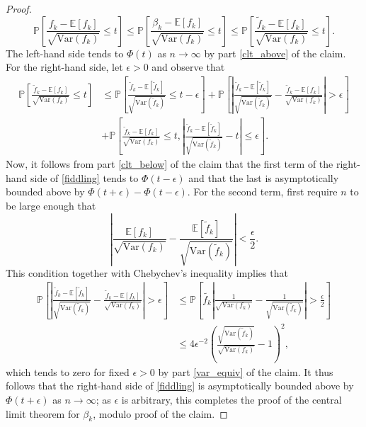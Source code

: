 \documentclass{amsart}
\theoremstyle{definition}
\newcommand{\E}{\mathbb{E}}
\renewcommand{\P}{\mathbb{P}}
\newcommand{\var}{\mathrm{Var}}
\renewcommand{\1}{\mathbb{1}}
\begin{document}
\begin{proof}
$$\P\left[\frac{f_k-\E[f_k]}{\sqrt{\var(f_k)}}\le
  t\right]\le\P\left[\frac{\beta_k-\E[f_k]}{\sqrt{\var(f_k)}}\le
  t\right]\le\P\left[\frac{\tilde{f}_k-\E[f_k]}{\sqrt{\var(f_k)}}\le
  t\right].$$ 
The left-hand side tends to $\Phi(t)$ as $n\to\infty$ by part \ref{clt_above}
of the claim.  For the right-hand side, let $\epsilon>0$ and observe that
\begin{equation}\begin{split}\label{fiddling}
\P\left[\frac{\tilde{f}_k-\E[f_k]}{\sqrt{\var(f_k)}}\le
  t\right]&\le\P\left[\frac{\tilde{f}_k-\E[\tilde{f}_k]}{\sqrt{\var(\tilde{f}_k)
}}\le  t-\epsilon\right]+\P\left[\left|\frac{\tilde{f}_k-\E[\tilde{f}_k]}{
\sqrt{\var(\tilde{f}_k)}}-\frac{\tilde{f}_k-\E[f_k]}{\sqrt{\var(f_k)
}}\right|>\epsilon\right]\\&
+\P\left[\frac{\tilde{f}_k-\E[f_k]}{\sqrt{\var(f_k)}}\le
  t, \left|\frac{\tilde{f}_k-\E[\tilde{f}_k]}{\sqrt{\var(\tilde{f}_k)
}}-t\right|\le \epsilon\right].
\end{split}\end{equation}
Now, it follows from part \ref{clt_below} of the claim that the first 
term of the right-hand side of \eqref{fiddling} tends to 
$\Phi(t-\epsilon)$ and that the last is asymptotically bounded above by
$\Phi(t+\epsilon)-\Phi(t-\epsilon)$.
For the second term, first require $n$ to be large enough that
$$\left|\frac{\E[f_k]}{\sqrt{\var(f_k)}}-\frac{\E[\tilde{f}_k]}{\sqrt{\var(
\tilde{f}_k)}}\right|<\frac{\epsilon}{2}.$$
This condition together with Chebychev's inequality implies that
\begin{equation*}\begin{split}
\P\left[\left|\frac{\tilde{f}_k-\E[\tilde{f}_k]}{
\sqrt{\var(\tilde{f}_k)}}-\frac{\tilde{f}_k-\E[f_k]}{\sqrt{\var(f_k)
}}\right|>\epsilon\right]&\le\P\left[\tilde{f_k}\left|\frac{1}{\sqrt{
\var(f_k)}}-\frac{1}{\sqrt{\var(\tilde{f}_k)}}\right|>\frac{\epsilon}{2}
\right]\\&\le4\epsilon^{-2}\left(\frac{\sqrt{\var(\tilde{f}_k)}}{\sqrt{
\var(f_k)}}-1\right)^2,
\end{split}\end{equation*}  
which tends to zero for fixed $\epsilon>0$ by part \ref{var_equiv}
of the claim.  It thus follows that the right-hand side of \eqref{fiddling}
is asymptotically bounded above by $\Phi(t+\epsilon)$ as $n\to\infty$; 
as $\epsilon$ is arbitrary, this completes the proof of the central limit
theorem for $\beta_k$, modulo proof of the claim.

\medskip


\end{proof}
\end{document}
